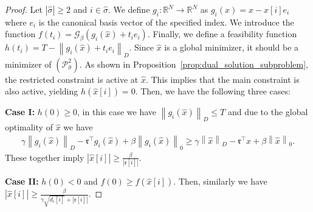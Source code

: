 \documentclass[11pt]{article}
\theoremstyle{plain}
\theoremstyle{definition}
\theoremstyle{plain}
\newcommand{\RR}{{\mathbb R}} %
\newcommand{\norm}[1]{\left\lVert#1\right\rVert}
\newcommand{\abs}[1]{\left\lvert#1\right\rvert}
\newcommand{\tpose}[1]{#1^{\top}}
\newcommand{\cG}{{\mathcal G}}
\newcommand{\cP}{{\mathcal P}}
\newcommand{\ccr}{{\mathfrak r}}
\begin{document}
\begin{proof}
    Let $\abs{\hat{\sigma}}\geq 2$ and  $i\in\hat{\sigma}$. We define $g_{i}:\RR^N\rightarrow \RR^N$ as $g_{i}(x)=x-x[i]e_i$ where $e_i$ is the canonical basis vector of the specified index. We introduce the function $f(t_i)=\cG_\beta(g_{i}(\hat{x})+t_ie_i)$. Finally, we define a feasibility function $h(t_i)=T-\norm{g_{i}(\hat{x})+t_ie_i}_D$.
   Since $\hat{x}$ is a global minimizer, it should be a minimizer of $(\cP^2_{\hat \sigma})$. As shown in Proposition~\ref{prop:dual_solution_subproblem}, the restricted constraint is active at $\hat{x}$. This implies that the main constraint is also active, yielding $h(\hat{x}[i])= 0$. Then, we have the following three cases:
   
   \textbf{Case I: } $h(0)\geq 0$, in this case we have $\norm{g_{i}(\hat{x})}_D\leq T$ and due to the global optimality of $\hat{x}$ we have
   \begin{align*}
       \gamma \norm{g_{i}(\hat{x})}_D-\tpose{\ccr}g_{i}(\hat{x})+\beta\norm{g_{i}(\hat{x})}_0\geq  \gamma \norm{\hat{x}}_D-\tpose{\ccr}\hat{x}+\beta\norm{\hat{x}}_0.
   \end{align*}
   These together imply $\abs{\hat{x}[i]}\geq\frac{\beta}{\abs{\ccr[i]}}$.
   
   \textbf{Case II: } $h(0)<0$ and $f(0)\geq f(\hat{x}[i])$. Then, similarly we have $\abs{\hat{x}[i]}\geq \frac{\beta}{\gamma\sqrt{d_i[i]}+\abs{\ccr[i]}}$.
   

\end{proof}
\end{document}

